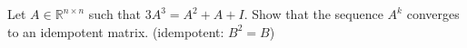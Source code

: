 Let $A\in\mathbb{R}^{n\times n}$ such that $3A^3=A^2+A+I$. Show that the sequence $A^k$ converges to an idempotent matrix. (idempotent: $B^2=B$)